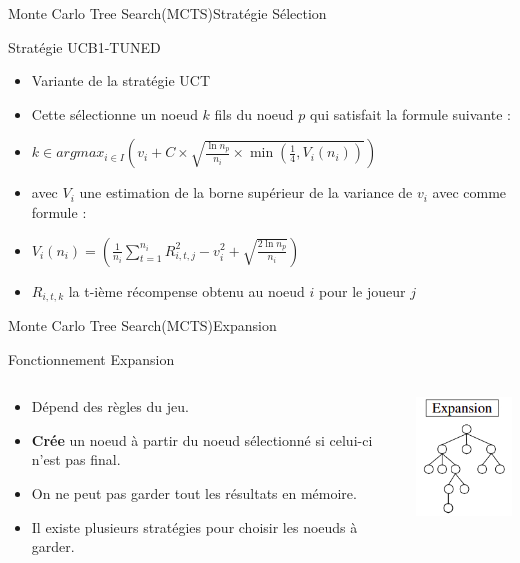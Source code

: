 \begin{frame}{Monte Carlo Tree Search(MCTS)}{Stratégie Sélection}
	\begin{block}{Stratégie UCB1-TUNED}
		\begin{itemize}
			\item Variante de la stratégie UCT
			\item Cette sélectionne un noeud $k$ fils du noeud $p$ qui satisfait la formule suivante :
			\item $k \in argmax_{i\in I}(v_{i} + C \times \sqrt{\frac{\ln n_{p}}{n_{i}}\times \min(\frac{1}{4}, V_{i}(n_{i}))})$
			\item avec $V_{i}$ une estimation de la borne supérieur de la variance de $v_{i}$ avec comme formule :
			\item $V_{i}(n_{i}) = (\frac{1}{n_{i}}\sum_{t=1}^{n_{i}}R_{i,t,j}^2 - v_{i}^2 + \sqrt{\frac{2\ln n_{p}}{n_{i}}})$
			\item $R_{i,t,k}$ la t-ième récompense obtenu au noeud $i$ pour le joueur $j$
		\end{itemize}
	\end{block}
\end{frame}

\begin{frame}{Monte Carlo Tree Search(MCTS)}{Expansion}
	\begin{block}{Fonctionnement Expansion}
		\begin{columns}
			\begin{column}{8cm}
				\begin{itemize}
					\item Dépend des règles du jeu.
					\item \textbf{Crée} un noeud à partir du noeud sélectionné si celui-ci n'est pas final.
					\item On ne peut pas garder tout les résultats en mémoire.
					\item Il existe plusieurs stratégies pour choisir les noeuds à garder.
				\end{itemize}
			\end{column}
			\begin{column}{4cm}
				\includegraphics[width=3cm]{ressources/Expansion.png}
			\end{column}
		\end{columns}
	\end{block}
\end{frame}

